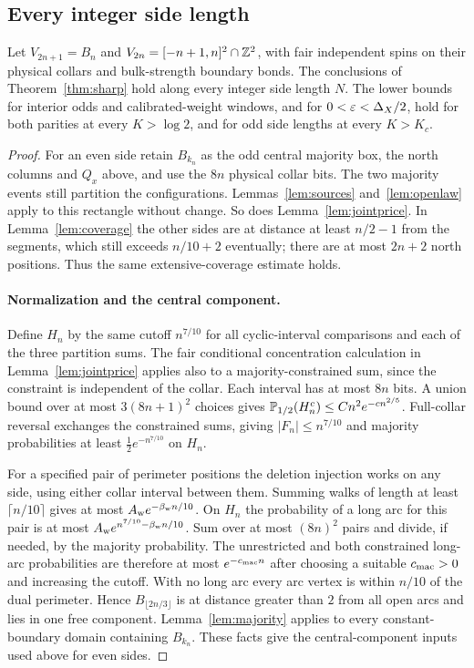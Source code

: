 \subsection{Every integer side length}
\begin{corollary}\label{cor:allsides}
Let $V_{2n+1}=B_n$ and $V_{2n}=[-n+1,n]^2\cap\mathbb Z^2$, with fair independent spins on their physical collars and bulk-strength boundary bonds. The conclusions of Theorem~\ref{thm:sharp} hold along every integer side length $N$. The lower bounds for interior odds and calibrated-weight windows, and for $0<\varepsilon<\Delta_X/2$, hold for both parities at every $K>\log2$, and for odd side lengths at every $K>K_c$.
\end{corollary}
\begin{proof}
For an even side retain $B_{k_n}$ as the odd central majority box, the north columns and $Q_x$ above, and use the $8n$ physical collar bits. The two majority events still partition the configurations. Lemmas~\ref{lem:sources} and~\ref{lem:openlaw} apply to this rectangle without change. So does Lemma~\ref{lem:jointprice}. In Lemma~\ref{lem:coverage} the other sides are at distance at least $n/2-1$ from the segments, which still exceeds $n/10+2$ eventually; there are at most $2n+2$ north positions. Thus the same extensive-coverage estimate holds.

\paragraph{Normalization and the central component.}
Define $H_n$ by the same cutoff $n^{7/10}$ for all cyclic-interval comparisons and each of the three partition sums. The fair conditional concentration calculation in Lemma~\ref{lem:jointprice} applies also to a majority-constrained sum, since the constraint is independent of the collar. Each interval has at most $8n$ bits. A union bound over at most $3(8n+1)^2$ choices gives $\mathbb P_{1/2}(H_n^c)\le Cn^2e^{-c n^{2/5}}$. Full-collar reversal exchanges the constrained sums, giving $|F_n|\le n^{7/10}$ and majority probabilities at least $\tfrac12e^{-n^{7/10}}$ on $H_n$.

For a specified pair of perimeter positions the deletion injection works on any side, using either collar interval between them. Summing walks of length at least $\lceil n/10\rceil$ gives at most $A_{\rm w}e^{-\beta_{\rm w}n/10}$. On $H_n$ the probability of a long arc for this pair is at most $A_{\rm w}e^{n^{7/10}-\beta_{\rm w}n/10}$. Sum over at most $(8n)^2$ pairs and divide, if needed, by the majority probability. The unrestricted and both constrained long-arc probabilities are therefore at most $e^{-c_{\rm mac}n}$ after choosing a suitable $c_{\rm mac}>0$ and increasing the cutoff. With no long arc every arc vertex is within $n/10$ of the dual perimeter. Hence $B_{\lfloor2n/3\rfloor}$ is at distance greater than $2$ from all open arcs and lies in one free component. Lemma~\ref{lem:majority} applies to every constant-boundary domain containing $B_{k_n}$. These facts give the central-component inputs used above for even sides.


\end{proof}
